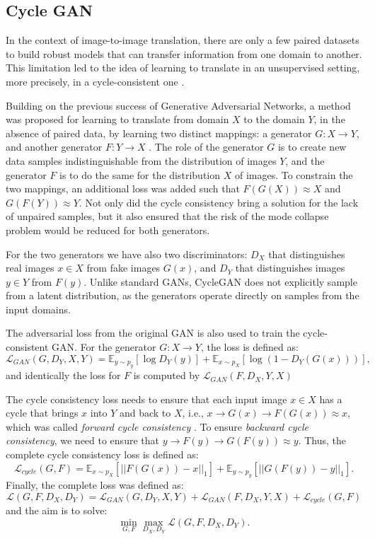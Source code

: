\subsection{Cycle GAN}
\label{subsec:cycle-gan}

In the context of image-to-image translation, there are only a few paired datasets to build robust models that can transfer information from one domain to another. This limitation led to the idea of learning to translate in an unsupervised setting, more precisely, in a cycle-consistent one \cite{zhu2017cyclegan}. 

Building on the previous success of Generative Adversarial Networks, a method was proposed for learning to translate from domain $X$ to the domain $Y$, in the absence of paired data, by learning two distinct mappings: a generator $G:X \to Y$, and another generator $F: Y \to X$ \cite{zhu2017cyclegan}. The role of the generator $G$ is to create new data samples indistinguishable from the distribution of images $Y$, and the generator $F$ is to do the same for the distribution $X$ of images. To constrain the two mappings, an additional loss was added such that $F(G(X)) \approx X$ and $G(F(Y)) \approx Y$. Not only did the cycle consistency bring a solution for the lack of unpaired samples, but it also ensured that the risk of the mode collapse problem would be reduced for both generators.

For the two generators we have also two discriminators: $D_X$ that distinguishes real images $x \in X$ from fake images $G(x)$, and $D_Y$ that distinguishes images $y \in Y$ from $F(y)$. Unlike standard GANs, CycleGAN does not explicitly sample from a latent distribution, as the generators operate directly on samples from the input domains.

The adversarial loss from the original GAN \cite{goodfellow2014gan} is also used to train the cycle-consistent GAN. For the generator $G:X \to Y$, the loss is defined as:
$$
\mathcal{L}_{GAN} (G, D_Y, X, Y) = \mathbb{E}_{y \sim p_y} [\log D_Y(y)] + \mathbb{E}_{x \sim p_X} [\log (1 - D_Y(G(x)))],
$$
and identically the loss for $F$ is computed by $\mathcal{L}_{GAN}(F, D_X, Y, X)$

The cycle consistency loss needs to ensure that each input image $x \in X$ has a cycle that brings $x$ into $Y$ and back to $X$, i.e., $x \to G(x) \to F(G(x)) \approx x$, which was called \textit{forward cycle consistency} \cite{zhu2017cyclegan}. To ensure \textit{backward cycle consistency}, we need to ensure that $y \to F(y) \to G(F(y)) \approx y$. Thus, the complete cycle consistency loss is defined as:
$$
\mathcal{L}_{cycle} (G, F) = \mathbb{E}_{x \sim p_X} [|| F(G(x)) - x||_1] + \mathbb{E}_{y \sim p_y} [|| G(F(y)) - y||_1].
$$
Finally, the complete loss was defined as:
$$
\mathcal{L} (G, F, D_X, D_Y) = \mathcal{L}_{GAN} (G, D_Y, X, Y) + \mathcal{L}_{GAN}(F, D_X, Y, X) + \mathcal{L}_{cycle} (G, F)
$$
and the aim is to solve:
$$ 
\min_{G, F} \max_{D_X, D_Y} \mathcal{L} (G, F, D_X, D_Y).
$$

